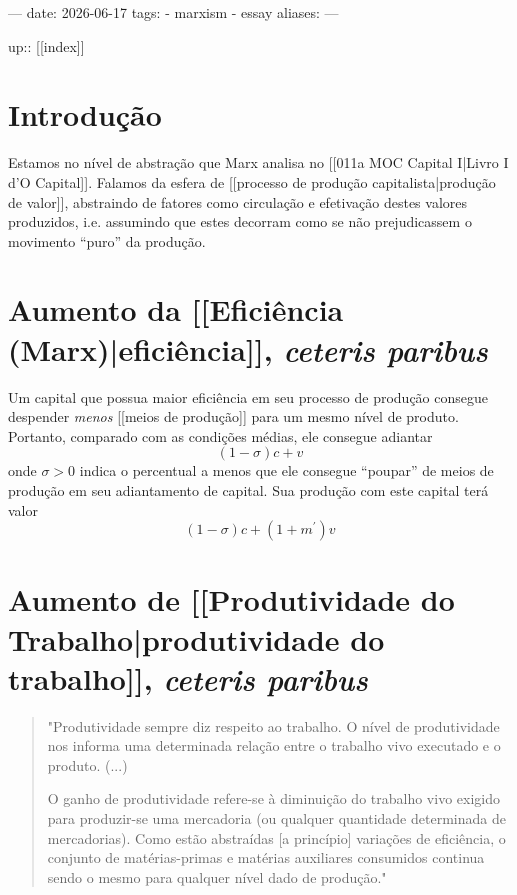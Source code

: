 ---
date: 2026-06-17
tags:
  - marxism
  - essay
aliases:
---

up:: [[index]]

\section{Introdução}
Estamos no nível de abstração que Marx analisa no [[011a MOC Capital I|Livro I d'O Capital]]. Falamos da esfera de [[processo de produção capitalista|produção de valor]], abstraindo de fatores como circulação e efetivação destes valores produzidos, i.e. assumindo que estes decorram como se não prejudicassem o movimento ``puro'' da produção. 

\section{Aumento da [[Eficiência (Marx)|eficiência]], \textit{ceteris paribus}}
Um capital que possua maior eficiência em seu processo de produção consegue despender \textit{menos} [[meios de produção]] para um mesmo nível de produto. Portanto, comparado com as condições médias, ele consegue adiantar 
$$
(1-\sigma)c + v
$$
onde $\sigma>0$ indica o percentual a menos que ele consegue ``poupar'' de meios de produção em seu adiantamento de capital. Sua produção com este capital terá valor
$$
(1-\sigma)c + (1+m^{\prime})v
$$

\section{Aumento de [[Produtividade do Trabalho|produtividade do trabalho]], \textit{ceteris paribus}}
\begin{quote}
"Produtividade sempre diz respeito ao trabalho. O nível de produtividade nos informa uma determinada relação entre o trabalho vivo executado e o produto. (...)

O ganho de produtividade refere-se à diminuição do trabalho vivo exigido para produzir-se uma mercadoria (ou qualquer quantidade determinada de mercadorias). Como estão abstraídas [a princípio] variações de eficiência, o conjunto de matérias-primas e matérias auxiliares consumidos continua sendo o mesmo para qualquer nível dado de produção." \parencite[p. 233]{SaBarreto2021a}
\end{quote}

